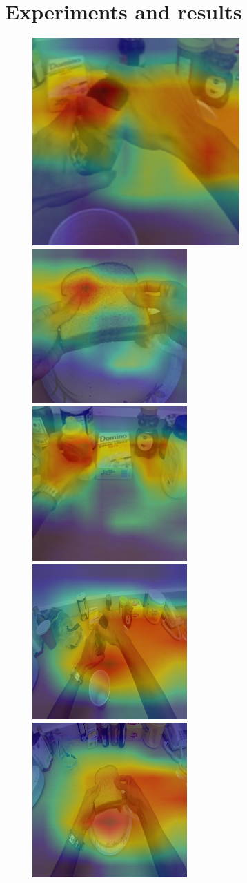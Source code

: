 \documentclass{article}
\begin{document}
\section{Experiments and results}

\begin{figure}[t]
    \begin{center}
        {\includegraphics[width=0.3\linewidth, height=0.25\linewidth]{open_S4_CofHoney_C1_0000000149}} \;
        {\includegraphics[width=0.3\linewidth, height=0.25\linewidth]{put_S4_Pealate_C1_0000001202}} \;
        {\includegraphics[width=0.3\linewidth, height=0.25\linewidth]{take_S4_Cheese_C1_0000000497}} \\ \vspace{0.5em}
        {\includegraphics[width=0.3\linewidth, height=0.25\linewidth]{open_S4_CofHoney_C1_0000000149_large}} \;
        {\includegraphics[width=0.3\linewidth, height=0.25\linewidth]{put_S4_Pealate_C1_0000001202_large}} \;

\end{center}
\end{figure}
\end{document}
